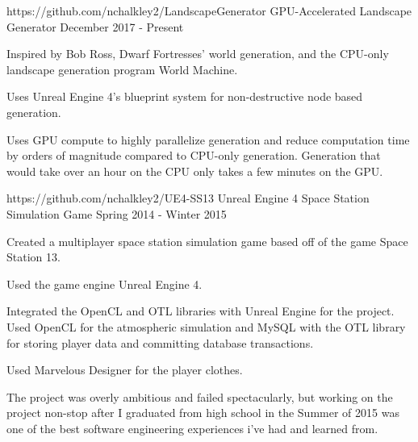 

\begin{cventries}

  \cventry
    {https://github.com/nchalkley2/LandscapeGenerator} %
	{GPU-Accelerated Landscape Generator} %
    {} %
    {December 2017 - Present} %
    {
      \begin{cvitems} %
        \item {Inspired by Bob Ross, Dwarf Fortresses' world generation, and the CPU-only landscape generation program World Machine.}
		\item {Uses Unreal Engine 4's blueprint system for non-destructive node based generation.}
		\item {Uses GPU compute to highly parallelize generation and reduce computation time by orders of magnitude compared to CPU-only generation. Generation that would take over an hour on the CPU only takes a few minutes on the GPU.}
      \end{cvitems}
    }

  \cventry
    {https://github.com/nchalkley2/UE4-SS13} %
	{Unreal Engine 4 Space Station Simulation Game} %
    {} %
    {Spring 2014 - Winter 2015} %
    {
      \begin{cvitems} %
	  	\item {Created a multiplayer space station simulation game based off of the game Space Station 13.}
		\item {Used the game engine Unreal Engine 4.}
		\item {Integrated the OpenCL and OTL libraries with Unreal Engine for the project. Used OpenCL for the atmospheric simulation and MySQL with the OTL library for storing player data and committing database transactions.}
		\item {Used Marvelous Designer for the player clothes.}
		\item {The project was overly ambitious and failed spectacularly, but working on the project non-stop after I graduated from high school in the Summer of 2015 was one of the best software engineering experiences i've had and learned from.}
      \end{cvitems}
    }
\end{cventries}
